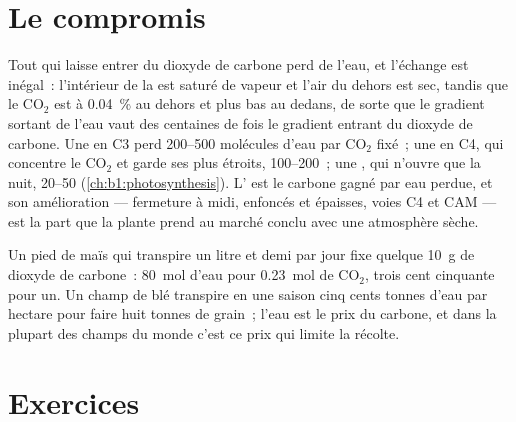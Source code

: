 \section{Le compromis}

\begin{proposition}\label{prop:b1:plant-transport:wue}
Tout  qui laisse entrer du dioxyde de carbone perd de l'eau, et
l'échange est inégal~: l'intérieur de la  est saturé de vapeur et
l'air du dehors est sec, tandis que le $\mathrm{CO_2}$ est à
\qty{0.04}{\%} au dehors et plus bas au dedans, de sorte que le
gradient sortant de l'eau vaut des centaines de fois le gradient
entrant du dioxyde de carbone. Une  en C3 perd
\qtyrange{200}{500}{} molécules d'eau par $\mathrm{CO_2}$ fixé~; une
 en C4, qui concentre le $\mathrm{CO_2}$ et garde ses 
plus étroits, \qtyrange{100}{200}{}~; une , qui n'ouvre que la
nuit, \qtyrange{20}{50}{} (\cref{ch:b1:photosynthesis}).
L'\emph{} est le carbone gagné par eau
perdue, et son amélioration --- fermeture à midi,  enfoncés et
 épaisses, voies C4 et CAM --- est la part que la plante prend
au marché conclu avec une atmosphère sèche.
\end{proposition}

\begin{example}\label{ex:b1:plant-transport:bargain}
Un pied de maïs qui transpire un litre et demi par jour fixe quelque
\qty{10}{g} de dioxyde de carbone~: \qty{80}{mol} d'eau pour
\qty{0.23}{mol} de $\mathrm{CO_2}$, trois cent cinquante pour un. Un
champ de blé transpire en une saison cinq cents tonnes d'eau par
hectare pour faire huit tonnes de grain~; l'eau est le prix du carbone,
et dans la plupart des champs du monde c'est ce prix qui limite la
récolte.
\end{example}

\section{Exercices}

